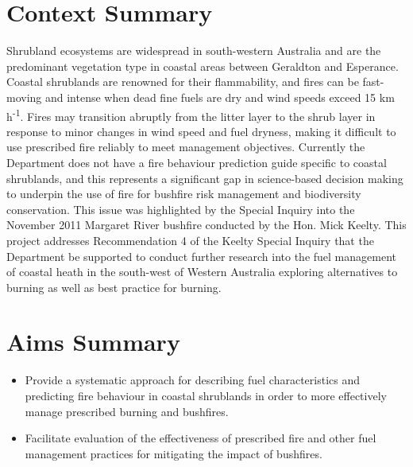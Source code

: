 \documentclass[version=last, paper=a4, DIV=18, usenames, dvipsnames]{scrartcl}
\begin{document}
%

%




\section*{Context Summary}
Shrubland ecosystems are widespread in south-western Australia and are
the predominant vegetation type in coastal areas between Geraldton and
Esperance. Coastal shrublands are renowned for their flammability, and
fires can be fast-moving and intense when dead fine fuels are dry and
wind speeds exceed 15 km h\textsuperscript{-1}. Fires may transition
abruptly from the litter layer to the shrub layer in response to minor
changes in wind speed and fuel dryness, making it difficult to use
prescribed fire reliably to meet management objectives. Currently the
Department does not have a fire behaviour prediction guide specific to
coastal shrublands, and this represents a significant gap in
science-based decision making to underpin the use of fire for bushfire
risk management and biodiversity conservation. This issue was
highlighted by the Special Inquiry into the November 2011 Margaret River
bushfire conducted by the Hon. Mick Keelty. This project addresses
Recommendation 4 of the Keelty Special Inquiry that the Department be
supported to conduct further research into the fuel management of
coastal heath in the south-west of Western Australia exploring
alternatives to burning as well as best practice for burning.



\section*{Aims Summary}
\begin{itemize}
\itemsep1pt\parskip0pt
\item
  Provide a systematic approach for describing fuel characteristics and
  predicting fire behaviour in coastal shrublands in order to more
  effectively manage prescribed burning and bushfires.
\item
  Facilitate evaluation of the effectiveness of prescribed fire and
  other fuel management practices for mitigating the impact of
  bushfires.
\end{itemize}
\end{document}
